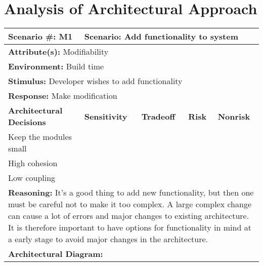 \section{Analysis of Architectural Approach}


\begin{tabular}{|m{}|m{}|m{}|m{}|m{}|m{}|}
  \hline
  {\bf Scenario \#:} M1 & \multicolumn{5}{m{0.75 \textwidth}|}{{\bf Scenario:} Add functionality to system} \\ \hline
  \multicolumn{6}{|m{0.9 \textwidth}|}{{\bf Attribute(s):} Modifiability} \\ \hline
  \multicolumn{6}{|m{0.9 \textwidth}|}{{\bf Environment:} Build time} \\ \hline
  \multicolumn{6}{|m{0.9 \textwidth}|}{{\bf Stimulus:} Developer wishes to add functionality} \\ \hline
  \multicolumn{6}{|m{0.9 \textwidth}|}{{\bf Response:} Make modification} \\ \hline
  \multicolumn{2}{|m{0.3 \textwidth}|}{\bf Architectural Decisions} & {\bf Sensitivity} & {\bf Tradeoff} & {\bf Risk} & {\bf Nonrisk} \\ \hline
  \multicolumn{2}{|m{0.3 \textwidth}|}{Keep the modules small} &  &  &  &  \\ \hline
  \multicolumn{2}{|m{0.3 \textwidth}|}{High cohesion} &  &  &  &  \\ \hline
  \multicolumn{2}{|m{0.3 \textwidth}|}{Low coupling} &  &  &  &  \\ \hline
  \multicolumn{6}{|m{0.9 \textwidth}|}{{\bf Reasoning:} It's a good thing to add new functionality, but then one must be careful not to make it too complex. A large complex change can cause a lot of errors and major changes to existing architecture. It is therefore important to have options for functionality in mind at a early stage to avoid major changes in the architecture.} \\ \hline
  \multicolumn{6}{|m{0.9 \textwidth}|}{{\bf Architectural Diagram:} } \\ \hline
\end{tabular}



